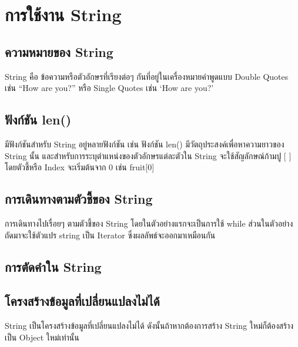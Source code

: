 \chapter{การใช้งาน String}
\section{ความหมายของ String}

String คือ ข้อความหรือตัวอักษรที่เรียงต่อๆ กันที่อยู่ในเครื่องหมายคำพูดแบบ Double Quotes เช่น “How are you?” หรือ Single Quotes เช่น ‘How are you?’ 

\section{ฟังก์ชัน len()}

มีฟังก์ชันสำหรับ String อยู่หลายฟังก์ชัน เช่น ฟังก์ชัน len() มีวัตถุประสงค์เพื่อหาความยาวของ String นั้น และสำหรับการระบุตำแหน่งของตัวอักษรแต่ละตัวใน String จะใช้สัญลักษณ์ก้ามปู [ ] โดยตัวชี้หรือ Index จะเริ่มต้นจาก 0 เช่น fruit[0] 

\section{การเดินทางตามตัวชี้ของ String}

การเดินทางไปเรื่อยๆ ตามตัวชี้ของ String โดยในตัวอย่างแรกจะเป็นการใช้ while ส่วนในตัวอย่างถัดมาจะใช้ตัวแปร string เป็น Iterator ซึ่งผลลัพธ์จะออกมาเหมือนกัน


\section{การตัดคำใน String}



\section{โครงสร้างข้อมูลที่เปลี่ยนแปลงไม่ได้}

String เป็นโครงสร้างข้อมูลที่เปลี่ยนแปลงไม่ได้ ดังนั้นถ้าหากต้องการสร้าง String ใหม่ก็ต้องสร้างเป็น Object ใหม่เท่านั้น

